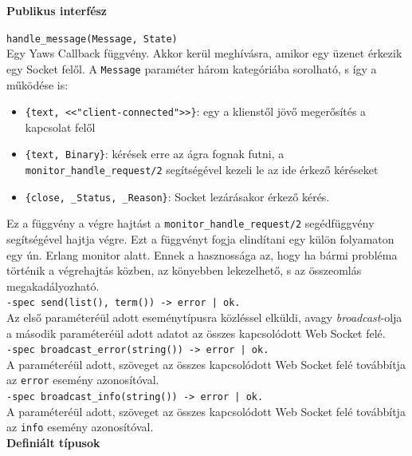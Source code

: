 \vspace{16pt}
\noindent \textbf{Publikus interfész}

\vspace{10pt}
\noindent \lstinline{handle_message(Message, State)} \\
\noindent Egy Yaws Callback függvény. Akkor kerül meghívásra, amikor egy üzenet érkezik egy Socket felől. A \lstinline{Message} paraméter három kategóriába sorolható, s így a működése is:
\begin{itemize}
    \item \lstinline|{text, <<"client-connected">>}|: egy a klienstől jövő megerősítés a kapcsolat felől
    \item \lstinline|{text, Binary}|: kérések erre az ágra fognak futni, a \lstinline{monitor_handle_request/2} segítségével kezeli le az ide érkező kéréseket
    \item \lstinline|{close, _Status, _Reason}|: Socket lezárásakor érkező kérés.
\end{itemize}
Ez a függvény a végre hajtást a \lstinline{monitor_handle_request/2} segédfüggvény segítségével hajtja végre. Ezt a függvényt fogja elindítani egy külön folyamaton egy ún. Erlang monitor alatt. Ennek a hasznossága az, hogy ha bármi probléma történik a végrehajtás közben, az könyebben lekezelhető, s az összeomlás megakadályozható.
\\


\noindent \lstinline{-spec send(list(), term()) -> error | ok.}\\
\noindent Az első paraméteréül adott eseménytípusra közléssel elküldi, avagy \textit{broadcast}-olja a második paraméteréül adott adatot az összes kapcsolódott Web Socket felé.\\

\noindent \lstinline{-spec broadcast_error(string()) -> error | ok.}\\
\noindent A paraméteréül adott, szöveget az összes kapcsolódott Web Socket felé továbbítja az \lstinline{error} esemény azonosítóval.\\

\noindent \lstinline{-spec broadcast_info(string()) -> error | ok.}\\
\noindent A paraméteréül adott, szöveget az összes kapcsolódott Web Socket felé továbbítja az \lstinline{info} esemény azonosítóval.\\


\vspace{14pt}
\noindent \textbf{Definiált típusok}

